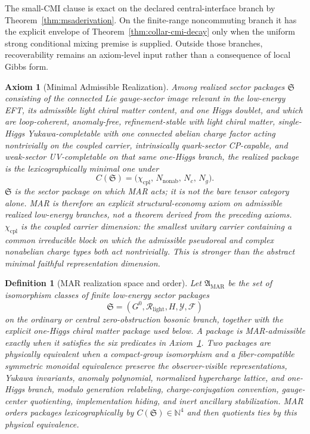 \documentclass[11pt]{article}
\newtheorem{definition}[theorem]{Definition}
\newtheorem{axiom}[theorem]{Axiom}
\begin{document}
The small-CMI clause is exact on the declared central-interface branch by
Theorem~\ref{thm:msaderivation}. On the finite-range noncommuting branch it has the explicit
envelope of Theorem~\ref{thm:collar-cmi-decay} only when the uniform strong conditional mixing
premise is supplied. Outside those branches, recoverability remains an axiom-level input rather
than a consequence of local Gibbs form.

\begin{axiom}[Minimal Admissible Realization]\label{ax:mar}
Among realized sector packages \(\mathfrak S\) consisting of the connected Lie gauge-sector image relevant in the low-energy EFT, its admissible light chiral matter content, and one Higgs doublet, and which are loop-coherent, anomaly-free, refinement-stable with light chiral matter, single-Higgs Yukawa-completable with one connected abelian charge factor acting nontrivially on the coupled carrier, intrinsically quark-sector CP-capable, and weak-sector UV-completable on that same one-Higgs branch, the realized package is the lexicographically minimal one under
\[
C(\mathfrak S)=\bigl(\chi_{\mathrm{cpl}},\,N_{\mathrm{nonab}},\,N_c,\,N_g\bigr).
\]
\(\mathfrak S\) is the sector package on which MAR acts; it is not the bare tensor category alone. MAR is therefore an explicit structural-economy axiom on admissible realized low-energy branches, not a theorem derived from the preceding axioms. \(\chi_{\mathrm{cpl}}\) is the coupled carrier dimension: the smallest unitary carrier containing a common irreducible block on which the admissible pseudoreal and complex nonabelian charge types both act nontrivially. This is stronger than the abstract minimal faithful representation dimension.
\end{axiom}

\begin{definition}[MAR realization space and order]\label{def:mar-space}
Let \(\mathfrak A_{\mathrm{MAR}}\) be the set of isomorphism classes of finite low-energy sector packages
\[
\mathfrak S=(G^0,\mathcal R_{\mathrm{light}},H,\mathcal Y,\mathcal F)
\]
on the ordinary or central zero-obstruction bosonic branch, together with the explicit one-Higgs chiral matter package used below. A package is MAR-admissible exactly when it satisfies the six predicates in Axiom~\ref{ax:mar}. Two packages are physically equivalent when a compact-group isomorphism and a fiber-compatible symmetric monoidal equivalence preserve the observer-visible representations, Yukawa invariants, anomaly polynomial, normalized hypercharge lattice, and one-Higgs branch, modulo generation relabeling, charge-conjugation convention, gauge-center quotienting, implementation hiding, and inert ancillary stabilization. MAR orders packages lexicographically by \(C(\mathfrak S)\in\mathbb N^4\) and then quotients ties by this physical equivalence.
\end{definition}
\end{document}
